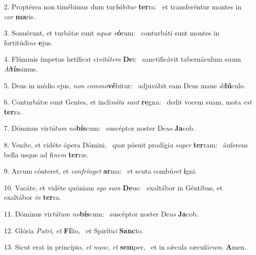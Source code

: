 2. Proptérea non timébimus dum tur\textit{bá}\textit{bi}\textit{tur} \textbf{ter}ra: \ast\  et transferéntur montes in \textit{cor} \textbf{ma}ris.\

3. Sonuérunt, et turbátæ sunt \textit{a}\textit{quæ} \textit{e}\textbf{ó}rum: \ast\  conturbáti sunt montes in fortitúdi\textit{ne} \textbf{e}jus.\

4. Flúminis ímpetus lætíficat ci\textit{vi}\textit{tá}\textit{tem} \textbf{De}i: \ast\  sanctificávit tabernáculum suum \textit{Al}\textbf{tís}simus.\

5. Deus in médio ejus, \textit{non} \textit{com}\textit{mo}\textbf{vé}bitur: \ast\  adjuvábit eam Deus mane \textit{di}\textbf{lú}culo.\

6. Conturbátæ sunt Gentes, et incli\textit{ná}\textit{ta} \textit{sunt} \textbf{re}gna: \ast\  dedit vocem suam, mota \textit{est} \textbf{ter}ra.\

7. Dóminus vir\textit{tú}\textit{tum} \textit{no}\textbf{bís}cum: \ast\  suscéptor noster De\textit{us} \textbf{Ja}cob.\

8. Veníte, et vidéte ópera Dómini, \dag\  quæ pósuit prodígi\textit{a} \textit{su}\textit{per} \textbf{ter}ram: \ast\  áuferens bella usque ad fi\textit{nem} \textbf{ter}ræ.\

9. Arcum cónteret, et \textit{con}\textit{frín}\textit{get} \textbf{ar}ma: \ast\  et scuta combú\textit{ret} \textbf{i}gni.\

10. Vacáte, et vidéte quóniam \textit{e}\textit{go} \textit{sum} \textbf{De}us: \ast\  exaltábor in Géntibus, et exaltábor \textit{in} \textbf{ter}ra.\

11. Dóminus vir\textit{tú}\textit{tum} \textit{no}\textbf{bís}cum: \ast\  suscéptor noster De\textit{us} \textbf{Ja}cob.\

12. Glória \textit{Pa}\textit{tri}, \textit{et} \textbf{Fí}lio, \ast\  et Spirítu\textit{i} \textbf{Sanc}to.\

13. Sicut erat in princípio, \textit{et} \textit{nunc}, \textit{et} \textbf{sem}per, \ast\  et in sǽcula sæculó\textit{rum}. \textbf{A}men.\

